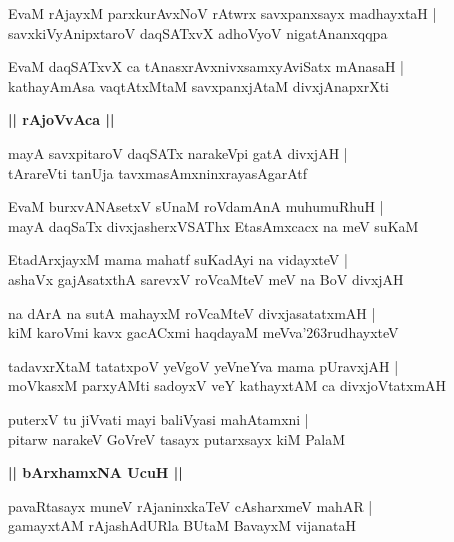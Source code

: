 \documentclass[twoside,12pt,openright]{book}
\def\S{\char'263}
\newcounter{shloka}[chapter]
\def\uvaca#1{\centerline{{\large\textbf{#1}}}}
\begin{document}
\begin{shloka}%
EvaM rAjayxM parxkurAvxNoV rAtwrx savxpanxsayx madhayxtaH |\\
savxkiVyAnipxtaroV daqSATxvX adhoVyoV nigatAnanxqqpa
\end{shloka}

\begin{shloka}%
EvaM daqSATxvX ca tAnasxrAvxnivxsamxyAviSatx mAnasaH |\\
kathayAmAsa vaqtAtxMtaM savxpanxjAtaM divxjAnapxrXti
\end{shloka}

\uvaca{|| rAjoVvAca ||}

\begin{shloka}%
mayA savxpitaroV daqSATx narakeVpi gatA divxjAH |\\
tArareVti tanUja tavxmasAmxninxrayasAgarAtf
\end{shloka}

\begin{shloka}%
EvaM burxvANAsetxV sUnaM roVdamAnA muhumuRhuH |\\
mayA daqSaTx divxjasherxVSAThx EtasAmxcacx na meV suKaM
\end{shloka}

\begin{shloka}%
EtadArxjayxM mama mahatf suKadAyi na vidayxteV |\\
ashaVx gajAsatxthA sarevxV roVcaMteV meV na BoV divxjAH 
\end{shloka}

\begin{shloka}%
na dArA na sutA mahayxM roVcaMteV divxjasatatxmAH |\\
kiM karoVmi kavx gacACxmi haqdayaM meVva\S rudhayxteV
\end{shloka}

\begin{shloka}%
tadavxrXtaM tatatxpoV yeVgoV yeVneYva mama pUravxjAH |\\
moVkasxM parxyAMti sadoyxV veY kathayxtAM ca divxjoVtatxmAH
\end{shloka}

\begin{shloka}%
puterxV tu jiVvati mayi baliVyasi mahAtamxni |\\
pitarw narakeV GoVreV tasayx putarxsayx kiM PalaM
\end{shloka}

\uvaca{|| bArxhamxNA UcuH ||}

\begin{shloka}%
pavaRtasayx muneV rAjaninxkaTeV cAsharxmeV mahAR |\\
gamayxtAM rAjashAdURla BUtaM BavayxM vijanataH 
\end{shloka}
\end{document}
